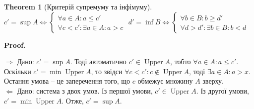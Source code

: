 \documentclass[a4paper, 14pt]{article}
\makeatletter
\def\qed{$\blacksquare$}
\def\rightproof{$\boxed{\Rightarrow}$ }
\def\leftproof{$\boxed{\Leftarrow}$ }
\theoremstyle{theoremdd}
\newtheorem{theorem}{Theorem}[subsection]
\theoremstyle{theoremdd}
\theoremstyle{theoremdd}
\theoremstyle{theoremdd}
\theoremstyle{theoremdd}
\theoremstyle{theoremdd}
\theoremstyle{theoremdd}
\theoremstyle{theoremdd}
\renewenvironment{proof}[1][Proof.\\]{\par
\pushQED{\hfill \qed}%
\normalfont \topsep6\p@\@plus6\p@\relax
\trivlist
\item\relax
{\bfseries
#1\@addpunct{.}}\hspace\labelsep\ignorespaces
}{%
\popQED\endtrivlist\@endpefalse
}
\DeclareMathOperator{\Up}{Upper}
\makeatother
\begin{document}
	\begin{theorem}[Критерій супремуму та інфімуму]
		$c' = \sup A \iff \begin{cases}
	 \forall a \in A: a \leq c' \\
	 \forall c < c': \exists a \in A: a > c
	\end{cases}$
	\qquad\qquad
	$d' = \inf B \iff \begin{cases} 
	 \forall b \in B: b \geq d'\\
	 \forall d > d': \exists b \in B: b < d
	\end{cases}$
	\begin{figure}[H]
	\centering
	\qquad
	\end{figure}
	\end{theorem}
	
	\begin{proof}
	\rightproof Дано: $c' = \sup A$. Тоді автоматично $c' \in \Up A$, тобто $\forall a \in A: a \leq c'$. \\
	Оскільки $c' = \min \Up A$, то звідси $\forall c < c': c \notin \Up A$, тоді $\exists a \in A: a > x$.\\
	Остання умова -- це заперечення того, що $c$ обмежує множину $A$ зверху.
	\bigskip \\
	\leftproof Дано: система з двох умов. Із першої умови, $c' \in \Up A$. Із другої умови, $c' = \min \Up A$. Отже, $c' = \sup A$.
	\end{proof}
	
\end{document}
